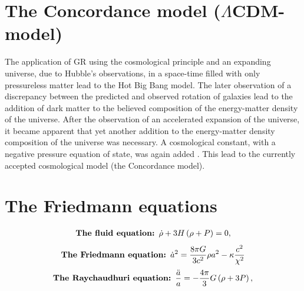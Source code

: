 \documentclass[a0,portrait]{a0poster}
\begin{document}
\begin{multicols}{2}
\color{DarkSlateGray} %

\section*{The Concordance model ($\Lambda$CDM-model)}
The application of GR using the cosmological principle and an expanding universe, due to Hubble's observations, in a space-time filled with only pressureless matter lead to the Hot Big Bang model. The later observation of a discrepancy between the  predicted and observed rotation of galaxies lead to the addition of dark matter to the believed composition of the energy-matter density of the universe. After the observation of an accelerated expansion of the universe, it became apparent that yet another addition to the energy-matter density composition of the universe was necessary. A cosmological constant, with a negative pressure equation of state, was again added \citep{GRFD}. This lead to the currently accepted cosmological model (the Concordance model).

\section*{The Friedmann equations}
\begin{equation}\label{eq:4}
\begin{split}
\text{\textbf{The fluid equation: }}\dot{\rho}+3H\left(\rho+P\right) &= 0,\\
\end{split}
\end{equation}
\begin{equation}
\begin{split}\label{eq:CurvFriedman}
\text{\textbf{The Friedmann equation: }}\dot{a}^{2} &= \frac{8\pi G}{3c^{2}}\rho a^{2}-\kappa\frac{c^{2}}{\chi^{2}}\\
\end{split}
\end{equation}
\begin{equation}\label{eq:RayEq}
\begin{split}
\text{\textbf{The Raychaudhuri equation: }}\frac{\ddot{a}}{a} &= -\frac{4\pi}{3}G\left(\rho +3P\right),\\
\end{split}
\end{equation}



\end{multicols}
\end{document}
